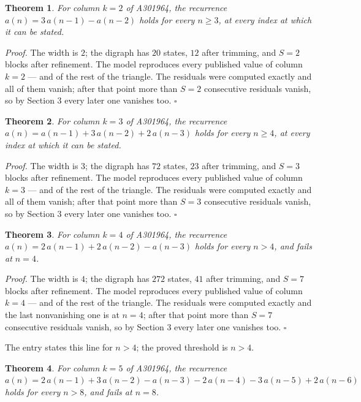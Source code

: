 \documentclass[11pt]{article}
\newtheorem{theorem}{Theorem}
\theoremstyle{definition}
\begin{document}
\begin{theorem} For column $k = 2$ of A301964, the recurrence $a(n) = 3\,a(n-1) - a(n-2)$ holds for every $n \ge 3$, at every index at which it can be stated.\end{theorem}

{\itshape Proof.} The width is $2$; the digraph has $20$ states, $12$ after trimming, and $S = 2$ blocks after refinement. The model reproduces every published value of column $k = 2$ --- and of the rest of the triangle. The residuals were computed exactly and all of them vanish; after that point more than $S = 2$ consecutive residuals vanish, so by Section 3 every later one vanishes too. $\square$

\begin{theorem} For column $k = 3$ of A301964, the recurrence $a(n) = a(n-1) + 3\,a(n-2) + 2\,a(n-3)$ holds for every $n \ge 4$, at every index at which it can be stated.\end{theorem}

{\itshape Proof.} The width is $3$; the digraph has $72$ states, $23$ after trimming, and $S = 3$ blocks after refinement. The model reproduces every published value of column $k = 3$ --- and of the rest of the triangle. The residuals were computed exactly and all of them vanish; after that point more than $S = 3$ consecutive residuals vanish, so by Section 3 every later one vanishes too. $\square$

\begin{theorem} For column $k = 4$ of A301964, the recurrence $a(n) = 2\,a(n-1) + 2\,a(n-2) - a(n-3)$ holds for every $n > 4$, and fails at $n = 4$.\end{theorem}

{\itshape Proof.} The width is $4$; the digraph has $272$ states, $41$ after trimming, and $S = 7$ blocks after refinement. The model reproduces every published value of column $k = 4$ --- and of the rest of the triangle. The residuals were computed exactly and the last nonvanishing one is at $n = 4$; after that point more than $S = 7$ consecutive residuals vanish, so by Section 3 every later one vanishes too. $\square$

The entry states this line for $n > 4$; the proved threshold is $n > 4$.

\begin{theorem} For column $k = 5$ of A301964, the recurrence $a(n) = 2\,a(n-1) + 3\,a(n-2) - a(n-3) - 2\,a(n-4) - 3\,a(n-5) + 2\,a(n-6)$ holds for every $n > 8$, and fails at $n = 8$.\end{theorem}
\end{document}
